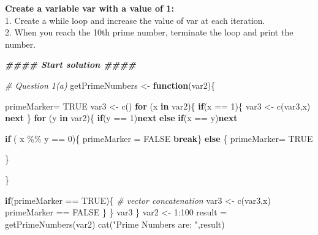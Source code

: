 \documentclass[
]{article}
\newenvironment{Shaded}{\begin{snugshade}}{\end{snugshade}}
\newcommand{\CommentTok}[1]{\textcolor[rgb]{0.56,0.35,0.01}{\textit{#1}}}
\newcommand{\ConstantTok}[1]{\textcolor[rgb]{0.00,0.00,0.00}{#1}}
\newcommand{\ControlFlowTok}[1]{\textcolor[rgb]{0.13,0.29,0.53}{\textbf{#1}}}
\newcommand{\DecValTok}[1]{\textcolor[rgb]{0.00,0.00,0.81}{#1}}
\newcommand{\DocumentationTok}[1]{\textcolor[rgb]{0.56,0.35,0.01}{\textbf{\textit{#1}}}}
\newcommand{\FunctionTok}[1]{\textcolor[rgb]{0.00,0.00,0.00}{#1}}
\newcommand{\NormalTok}[1]{#1}
\newcommand{\OtherTok}[1]{\textcolor[rgb]{0.56,0.35,0.01}{#1}}
\newcommand{\SpecialCharTok}[1]{\textcolor[rgb]{0.00,0.00,0.00}{#1}}
\newcommand{\StringTok}[1]{\textcolor[rgb]{0.31,0.60,0.02}{#1}}
\begin{document}
\textbf{Create a variable var with a value of 1:}\\
1. Create a while loop and increase the value of var at each
iteration.\\
2. When you reach the 10th prime number, terminate the loop and print
the number.

\begin{Shaded}
\begin{Highlighting}[]
\DocumentationTok{\#\#\#\# Start solution \#\#\#\#}
\end{Highlighting}
\end{Shaded}

\begin{Shaded}
\begin{Highlighting}[]
\CommentTok{\# Question 1(a)}
\NormalTok{getPrimeNumbers }\OtherTok{\textless{}{-}} \ControlFlowTok{function}\NormalTok{(var2)\{}
     
\NormalTok{   primeMarker}\OtherTok{=} \ConstantTok{TRUE}  
\NormalTok{   var3 }\OtherTok{\textless{}{-}} \FunctionTok{c}\NormalTok{()}
   \ControlFlowTok{for}\NormalTok{ (x }\ControlFlowTok{in}\NormalTok{ var2)\{}
     \ControlFlowTok{if}\NormalTok{(x }\SpecialCharTok{==} \DecValTok{1}\NormalTok{)\{}
\NormalTok{          var3 }\OtherTok{\textless{}{-}} \FunctionTok{c}\NormalTok{(var3,x)}
          \ControlFlowTok{next}
\NormalTok{     \}}
     \ControlFlowTok{for}\NormalTok{ (y }\ControlFlowTok{in}\NormalTok{ var2)\{}
          \ControlFlowTok{if}\NormalTok{(y }\SpecialCharTok{==} \DecValTok{1}\NormalTok{)}\ControlFlowTok{next}
          \ControlFlowTok{else} \ControlFlowTok{if}\NormalTok{(x }\SpecialCharTok{==}\NormalTok{ y)}\ControlFlowTok{next}
          
          \ControlFlowTok{if}\NormalTok{ ( x }\SpecialCharTok{\%\%}\NormalTok{ y }\SpecialCharTok{==} \DecValTok{0}\NormalTok{)\{}
\NormalTok{               primeMarker }\OtherTok{=} \ConstantTok{FALSE}
               \ControlFlowTok{break}\NormalTok{\}}
          \ControlFlowTok{else}\NormalTok{ \{}
\NormalTok{               primeMarker}\OtherTok{=} \ConstantTok{TRUE}
               
\NormalTok{          \}}
          
\NormalTok{     \} }
     
     \ControlFlowTok{if}\NormalTok{(primeMarker }\SpecialCharTok{==} \ConstantTok{TRUE}\NormalTok{)\{}
          \CommentTok{\# vector concatenation}
\NormalTok{          var3 }\OtherTok{\textless{}{-}} \FunctionTok{c}\NormalTok{(var3,x)}
\NormalTok{          primeMarker }\SpecialCharTok{==} \ConstantTok{FALSE}
\NormalTok{     \}}
\NormalTok{   \}}
\NormalTok{   var3}
\NormalTok{\}}
\NormalTok{var2 }\OtherTok{\textless{}{-}} \DecValTok{1}\SpecialCharTok{:}\DecValTok{100}
\NormalTok{result }\OtherTok{=} \FunctionTok{getPrimeNumbers}\NormalTok{(var2)}
\FunctionTok{cat}\NormalTok{(}\StringTok{"Prime Numbers are: "}\NormalTok{,result)}
\end{Highlighting}
\end{Shaded}
\end{document}
